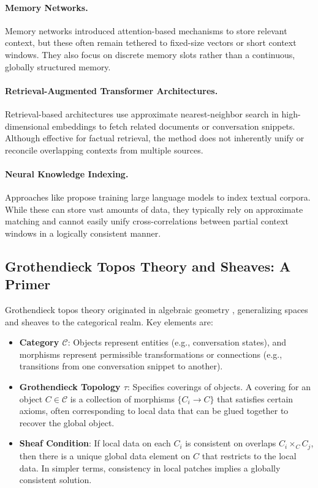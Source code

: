 \documentclass{article}
\begin{document}
\paragraph{Memory Networks.}
Memory networks \citep{weston2014memory, sukhbaatar2015end} introduced attention-based mechanisms to store relevant context, but these often remain tethered to fixed-size vectors or short context windows. They also focus on discrete memory slots rather than a continuous, globally structured memory.

\paragraph{Retrieval-Augmented Transformer Architectures.}
Retrieval-based architectures \citep{karpukhin2020dense, lewis2020retrieval} use approximate nearest-neighbor search in high-dimensional embeddings to fetch related documents or conversation snippets. Although effective for factual retrieval, the method does not inherently unify or reconcile overlapping contexts from multiple sources.

\paragraph{Neural Knowledge Indexing.}
Approaches like \citet{izacard2022few} propose training large language models to index textual corpora. While these can store vast amounts of data, they typically rely on approximate matching and cannot easily unify cross-correlations between partial context windows in a logically consistent manner.

\subsection{Grothendieck Topos Theory and Sheaves: A Primer}

Grothendieck topos theory originated in algebraic geometry \citep{grothendieck1972}, generalizing spaces and sheaves to the categorical realm. Key elements are:
\begin{itemize}
    \item \textbf{Category \(\mathcal{C}\)}: Objects represent entities (e.g., conversation states), and morphisms represent permissible transformations or connections (e.g., transitions from one conversation snippet to another).
    \item \textbf{Grothendieck Topology \(\tau\)}: Specifies coverings of objects. A covering for an object \(C \in \mathcal{C}\) is a collection of morphisms \(\{C_i \to C\}\) that satisfies certain axioms, often corresponding to local data that can be glued together to recover the global object.
    \item \textbf{Sheaf Condition}: If local data on each \(C_i\) is consistent on overlaps \(C_i \times_C C_j\), then there is a unique global data element on \(C\) that restricts to the local data. In simpler terms, consistency in local patches implies a globally consistent solution.
\end{itemize}
\end{document}
